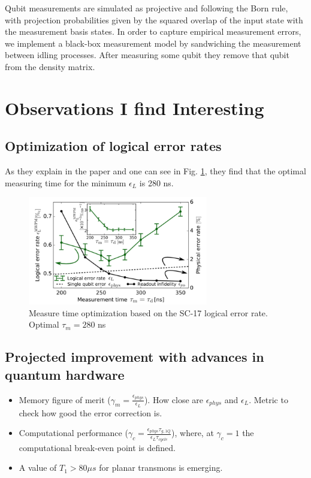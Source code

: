 \documentclass[11pt]{article}
\begin{document}
Qubit measurements are simulated as projective and following the Born rule, with projection probabilities given by the squared overlap of the input state with the measurement basis states. In order to capture empirical measurement errors, we implement a black-box measurement model by sandwiching the measurement between idling processes. After measuring some qubit they remove that qubit from the density matrix.


\section{Observations I find Interesting}
\label{sec:org1811e54}
\subsection{Optimization of logical error rates}
\label{sec:org9c6672b}

As they explain in the paper and one can see in Fig. \ref{fig:orge3ec83e}, they find that the optimal measuring time for the minimum \(\epsilon_L\) is 280 ns.

\begin{figure}[htbp]
\centering
\includegraphics[width=0.7\textwidth]{measure_t_optimization.png}
\caption{\label{fig:orge3ec83e}
Measure time optimization based on the SC-17 logical error rate. Optimal \(\tau_m = 280\) ns}
\end{figure}


\subsection{Projected improvement with advances in quantum hardware}
\label{sec:org0aa51e6}

\begin{itemize}
\item Memory figure of merit (\(\gamma_m = \frac{\epsilon_{phys}}{\epsilon_{L}}\)). How close are \(\epsilon_{phys}\) and \(\epsilon_{L}\). Metric to check how good the error correction is.

\item Computational performance (\(\gamma_c = \frac{\epsilon_{phys} \tau_{g,1Q}}{\epsilon_L \tau_{cycle}}\)), where, at \(\gamma_c = 1\) the computational break-even point is defined.

\item A value of \(T_1 > 80 \mu s\) for planar transmons is emerging.
\end{itemize}
\end{document}
